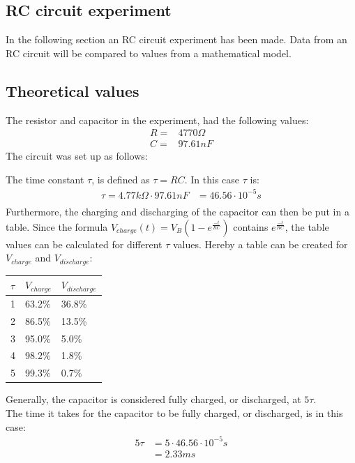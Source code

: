 \subsection{RC circuit experiment}
In the following section an RC circuit experiment has been made. Data from an RC circuit will be compared to values from a mathematical model.
\subsection{Theoretical values}
The resistor and capacitor in the experiment, had the following values:
\begin{align*}
 R =& 4770\Omega \\
 C =& 97.61nF
\end{align*}
The circuit was set up as follows:
\begin{figure}[H]
	
\end{figure}
The time constant $\tau$, is defined as $\tau = RC$. In this case $\tau$ is:
\begin{align*}
	\tau = 4.77 k\Omega \cdot 97.61 nF &= 46.56 \cdot 10^{-5} s \\
\end{align*}
Furthermore, the charging and discharging of the capacitor can then be put in a table. Since the formula $V_{charge}(t)=V_B(1-e^{\frac{-t}{RC}})$ contains $e^{\frac{-t}{RC}}$, the table values can be calculated for different $\tau$ values. Hereby a table can be created for $V_{charge}$ and $V_{discharge}$:
\begin{table}[H]
\center
\begin{tabular}{|l|l|l|}
\hline
$\tau$ & $V_{charge}$ & $V_{discharge}$ \\ \hline
1      & 63.2\%       & 36.8\%         \\ \hline
2      & 86.5\%       & 13.5\%         \\ \hline
3      & 95.0\%       & 5.0\%          \\ \hline
4      & 98.2\%       & 1.8\%          \\ \hline
5      & 99.3\%       & 0.7\%          \\ \hline
\end{tabular}
\end{table}
Generally, the capacitor is considered fully charged, or discharged, at $5\tau$. \\
The time it takes for the capacitor to be fully charged, or discharged, is in this case:
\begin{align*}
5\tau &= 5 \cdot 46.56 \cdot 10^{-5} s \\
&= 2.33 ms
\end{align*}

